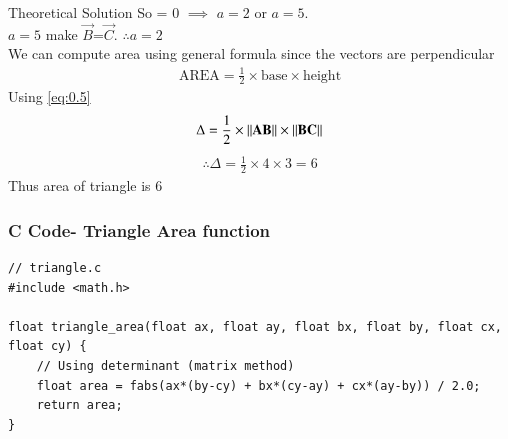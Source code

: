 \documentclass{beamer}
\begin{document}
\begin{frame}{Theoretical Solution}
	So  = 0 $\implies$ $a = 2$ or $a = 5$.\\
$a = 5$ make $\vec{B}$=$\vec{C}$. $\therefore a =2$  \\
We can compute area using general formula since the vectors are perpendicular
\begin{align}
	\text{AREA} = \frac{1}{2}\times\text{base}\times\text{height} \label{eq:0.5}
\end{align}
Using \eqref{eq:0.5}
\begin{align}
	\Delta = \frac{1}{2}\times\left\lVert\mathbf{AB}\right\rVert\times\left\lVert\mathbf{BC}\right\rVert
\end{align}
\begin{align}
	\therefore	\Delta = \frac{1}{2}\times4\times3 = 6
\end{align}
Thus area of triangle is 6\\

	\end{frame}

	\begin{frame}[fragile]
	\frametitle{C Code- Triangle Area function }
	
	\begin{lstlisting}
// triangle.c
#include <math.h>

float triangle_area(float ax, float ay, float bx, float by, float cx, float cy) {
	// Using determinant (matrix method)
	float area = fabs(ax*(by-cy) + bx*(cy-ay) + cx*(ay-by)) / 2.0;
	return area;
}
	\end{lstlisting}
\end{frame}
\end{document}
